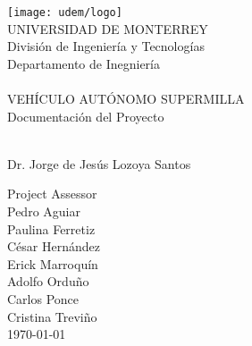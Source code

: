 \begin{titlepage}
	\begin{center}
		\texttt{[image: udem/logo]}\\
		\vspace{2mm}
		\huge UNIVERSIDAD DE MONTERREY\\
		\vspace{1mm}
		\Large División de Ingeniería y Tecnologías\\
		\vspace{1mm}
		\large Departamento de Inegniería\\
		\vspace{10mm}
		\horrule{1pt} \\[0.4cm]
		\Huge VEHÍCULO AUTÓNOMO SUPERMILLA\\ 
		\large Documentación del Proyecto\\
		\horrule{2pt} \\[0.5cm]
		\vspace{6mm}
		\Large\raggedright Dr. Jorge de Jesús Lozoya Santos\\
		\normalsize\raggedright Project Assessor\\
		\vspace{4mm}
		\large\raggedleft Pedro Aguiar\\
		\large\raggedleft Paulina Ferretiz\\
		\large\raggedleft César Hernández\\
		\large\raggedleft Erick Marroquín\\
		\large\raggedleft Adolfo Orduño\\
		\large\raggedleft Carlos Ponce\\
		\large\raggedleft Cristina Treviño\\
		\vspace{10mm}
		\Large\centering\today\\
	\end{center}
\end{titlepage}
